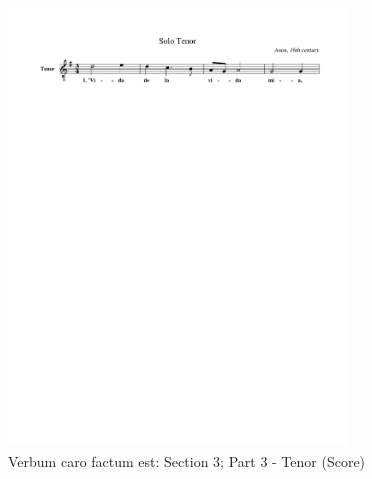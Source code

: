 \begin{figure}[H]
  \begin{center}
    \includegraphics[width=0.8\textwidth, clip=true, trim = 15mm 231mm 0mm 0mm]{img/303.pdf}
    \caption{Verbum caro factum est: Section 3; Part 3 - Tenor (Score)}
  \end{center}
\end{figure}



